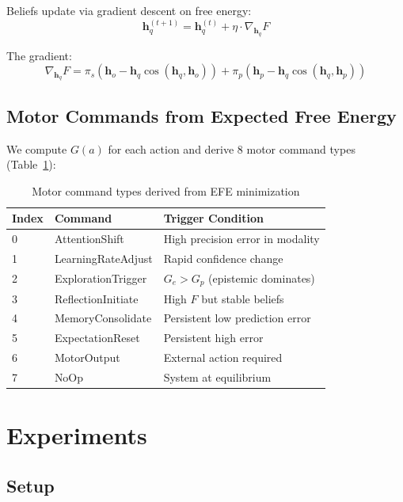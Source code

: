 \documentclass{article}
\begin{document}
Beliefs update via gradient descent on free energy:
\begin{equation}
\mathbf{h}_q^{(t+1)} = \mathbf{h}_q^{(t)} + \eta \cdot \nabla_{\mathbf{h}_q} F
\end{equation}

The gradient:
\begin{equation}
\nabla_{\mathbf{h}_q} F = \pi_s(\mathbf{h}_o - \mathbf{h}_q\cos(\mathbf{h}_q, \mathbf{h}_o)) + \pi_p(\mathbf{h}_p - \mathbf{h}_q\cos(\mathbf{h}_q, \mathbf{h}_p))
\end{equation}

\subsection{Motor Commands from Expected Free Energy}

We compute $G(a)$ for each action and derive 8 motor command types (Table~\ref{tab:motor}):

\begin{table}[h]
\centering
\caption{Motor command types derived from EFE minimization}
\label{tab:motor}
\begin{tabular}{@{}lll@{}}
\toprule
Index & Command & Trigger Condition \\
\midrule
0 & AttentionShift & High precision error in modality \\
1 & LearningRateAdjust & Rapid confidence change \\
2 & ExplorationTrigger & $G_e > G_p$ (epistemic dominates) \\
3 & ReflectionInitiate & High $F$ but stable beliefs \\
4 & MemoryConsolidate & Persistent low prediction error \\
5 & ExpectationReset & Persistent high error \\
6 & MotorOutput & External action required \\
7 & NoOp & System at equilibrium \\
\bottomrule
\end{tabular}
\end{table}

\section{Experiments}

\subsection{Setup}
\end{document}
